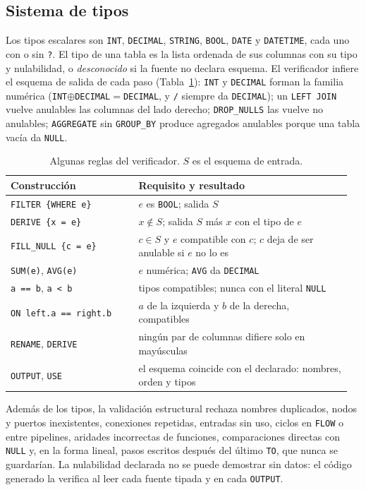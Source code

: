 \documentclass[sigplan,screen,nonacm]{acmart}
\begin{document}
\subsection{Sistema de tipos}
Los tipos escalares son \texttt{INT}, \texttt{DECIMAL}, \texttt{STRING}, \texttt{BOOL},
\texttt{DATE} y \texttt{DATETIME}, cada uno con o sin \texttt{?}. El tipo de una tabla es la
lista ordenada de sus columnas con su tipo y nulabilidad, o \emph{desconocido} si la fuente
no declara esquema. El verificador infiere el esquema de salida de cada paso
(Tabla~\ref{tab:reglas}): \texttt{INT} y \texttt{DECIMAL} forman la familia numérica
(\texttt{INT}$\oplus$\texttt{DECIMAL}$=$\texttt{DECIMAL}, y \texttt{/} siempre da
\texttt{DECIMAL}); un \texttt{LEFT JOIN} vuelve anulables las columnas del lado derecho;
\texttt{DROP\_NULLS} las vuelve no anulables; \texttt{AGGREGATE} sin \texttt{GROUP\_BY} produce
agregados anulables porque una tabla vacía da \texttt{NULL}.

\begin{table}[t]
\caption{Algunas reglas del verificador. $S$ es el esquema de entrada.}
\label{tab:reglas}
\footnotesize
\begin{tabular}{@{}p{0.36\linewidth}p{0.60\linewidth}@{}}
\toprule
Construcción & Requisito y resultado \\
\midrule
\texttt{FILTER \{WHERE e\}} & $e$ es \texttt{BOOL}; salida $S$ \\
\texttt{DERIVE \{x = e\}} & $x\notin S$; salida $S$ más $x$ con el tipo de $e$ \\
\texttt{FILL\_NULL \{c = e\}} & $c\in S$ y $e$ compatible con $c$; $c$ deja de ser
  anulable si $e$ no lo es \\
\texttt{SUM(e)}, \texttt{AVG(e)} & $e$ numérica; \texttt{AVG} da \texttt{DECIMAL} \\
\texttt{a == b}, \texttt{a < b} & tipos compatibles; nunca con el literal \texttt{NULL} \\
\texttt{ON left.a == right.b} & $a$ de la izquierda y $b$ de la derecha, compatibles \\
\texttt{RENAME}, \texttt{DERIVE} & ningún par de columnas difiere solo en mayúsculas \\
\texttt{OUTPUT}, \texttt{USE} & el esquema coincide con el declarado: nombres, orden y tipos \\
\bottomrule
\end{tabular}
\end{table}

Además de los tipos, la validación estructural rechaza nombres duplicados, nodos y puertos
inexistentes, conexiones repetidas, entradas sin uso, ciclos en \texttt{FLOW} o entre
pipelines, aridades incorrectas de funciones, comparaciones directas con \texttt{NULL} y,
en la forma lineal, pasos escritos después del último \texttt{TO}, que nunca se guardarían.
La nulabilidad declarada no se puede demostrar sin datos: el código generado la verifica al
leer cada fuente tipada y en cada \texttt{OUTPUT}.
\end{document}
